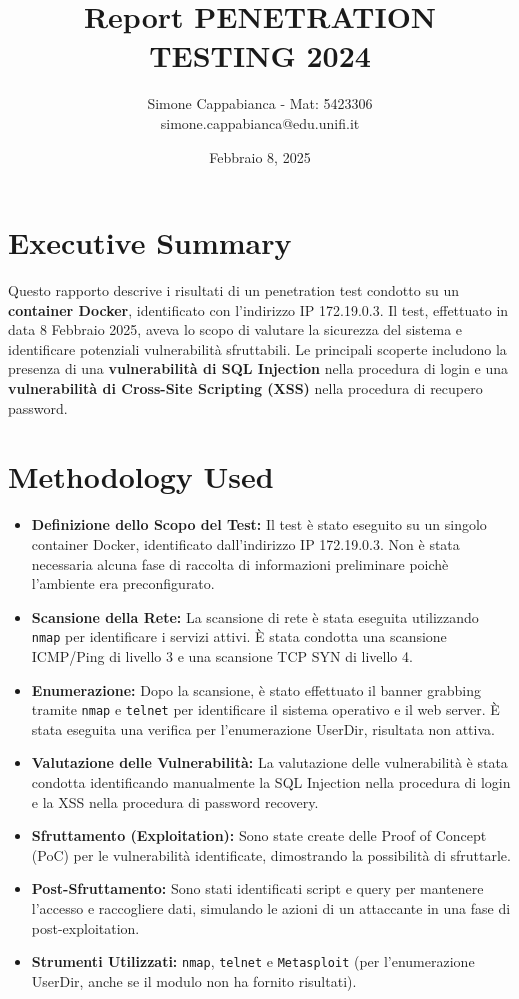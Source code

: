\documentclass[12pt]{article}
\title{ Report PENETRATION TESTING 2024}
\author{Simone Cappabianca - Mat: 5423306 \\  simone.cappabianca@edu.unifi.it}
\date{Febbraio 8, 2025}
\begin{document}
\maketitle
\newpage

\tableofcontents
\newpage

\section{Executive Summary}

Questo rapporto descrive i risultati di un penetration test condotto su un 
\textbf{container Docker}, identificato con l'indirizzo IP 172.19.0.3. Il test, 
effettuato in data 8 Febbraio 2025, aveva lo scopo di valutare la sicurezza del 
sistema e identificare potenziali vulnerabilit\`{a} sfruttabili. Le principali scoperte 
includono la presenza di una \textbf{vulnerabilit\`{a} di SQL Injection} nella procedura 
di login e una \textbf{vulnerabilit\`{a} di Cross-Site Scripting (XSS)} nella procedura 
di recupero password.

\section{Methodology Used}
\begin{itemize}
    \item \textbf{Definizione dello Scopo del Test:} Il test \`{e} stato eseguito su 
    un singolo container Docker, identificato dall'indirizzo IP 172.19.0.3. Non 
    \`{e} stata necessaria alcuna fase di raccolta di informazioni preliminare 
    poich\`{e} l'ambiente era preconfigurato.
    \item \textbf{Scansione della Rete:} La scansione di rete \`{e} stata eseguita 
    utilizzando \texttt{nmap} per identificare i servizi attivi. \`{E} stata condotta una 
    scansione ICMP/Ping di livello 3 e una scansione TCP SYN di livello 4.
    \item \textbf{Enumerazione:} Dopo la scansione, \`{e} stato effettuato il banner 
    grabbing tramite \texttt{nmap} e \texttt{telnet} per identificare il sistema 
    operativo e il web server. \`{E} stata eseguita una verifica per l'enumerazione 
    UserDir, risultata non attiva.
    \item \textbf{Valutazione delle Vulnerabilit\`{a}:} La valutazione delle 
    vulnerabilit\`{a} \`{e} stata condotta identificando manualmente la SQL Injection 
    nella procedura di login e la XSS nella procedura di password recovery.
    \item \textbf{Sfruttamento (Exploitation):} Sono state create delle Proof of 
    Concept (PoC) per le vulnerabilit\`{a} identificate, dimostrando la 
    possibilit\`{a} di sfruttarle.
    \item \textbf{Post-Sfruttamento:} Sono stati identificati script e query per 
    mantenere l'accesso e raccogliere dati, simulando le azioni di un attaccante 
    in una fase di post-exploitation.
    \item \textbf{Strumenti Utilizzati:} \texttt{nmap}, \texttt{telnet} e \texttt{Metasploit} 
    (per l'enumerazione UserDir, anche se il modulo non ha fornito risultati).
\end{itemize}
\end{document}
